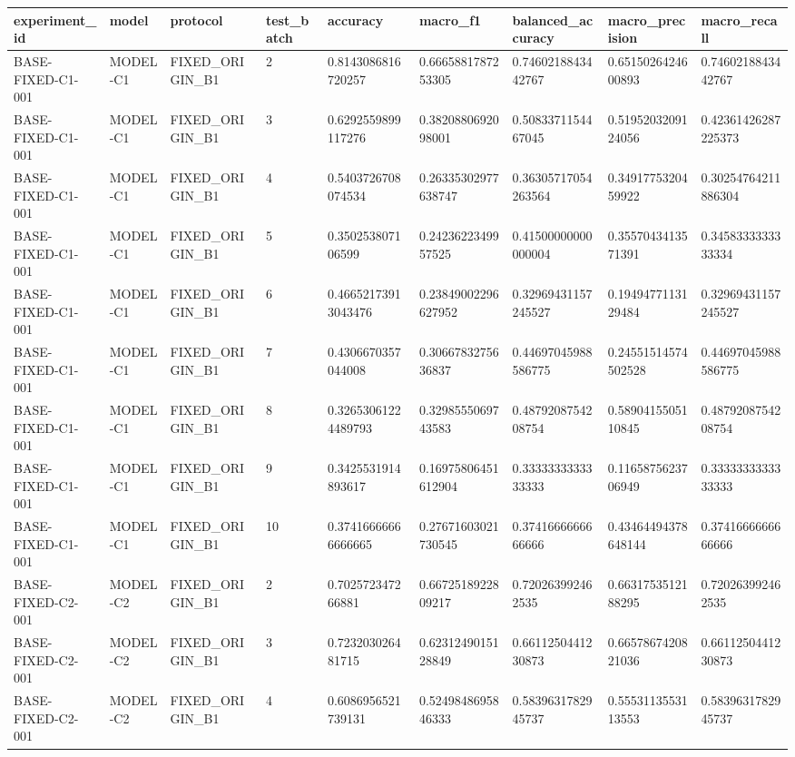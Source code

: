\begin{tabular}{lllllllll}
 \hline
experiment\_id & model & protocol & test\_batch & accuracy & macro\_f1 & balanced\_accuracy & macro\_precision & macro\_recall \\
 \hline
BASE-FIXED-C1-001 & MODEL-C1 & FIXED\_ORIGIN\_B1 & 2 & 0.8143086816720257 & 0.6665881787253305 & 0.7460218843442767 & 0.6515026424600893 & 0.7460218843442767 \\
BASE-FIXED-C1-001 & MODEL-C1 & FIXED\_ORIGIN\_B1 & 3 & 0.6292559899117276 & 0.3820880692098001 & 0.5083371154467045 & 0.5195203209124056 & 0.42361426287225373 \\
BASE-FIXED-C1-001 & MODEL-C1 & FIXED\_ORIGIN\_B1 & 4 & 0.5403726708074534 & 0.26335302977638747 & 0.36305717054263564 & 0.3491775320459922 & 0.30254764211886304 \\
BASE-FIXED-C1-001 & MODEL-C1 & FIXED\_ORIGIN\_B1 & 5 & 0.350253807106599 & 0.2423622349957525 & 0.41500000000000004 & 0.3557043413571391 & 0.3458333333333334 \\
BASE-FIXED-C1-001 & MODEL-C1 & FIXED\_ORIGIN\_B1 & 6 & 0.46652173913043476 & 0.23849002296627952 & 0.32969431157245527 & 0.1949477113129484 & 0.32969431157245527 \\
BASE-FIXED-C1-001 & MODEL-C1 & FIXED\_ORIGIN\_B1 & 7 & 0.4306670357044008 & 0.3066783275636837 & 0.44697045988586775 & 0.24551514574502528 & 0.44697045988586775 \\
BASE-FIXED-C1-001 & MODEL-C1 & FIXED\_ORIGIN\_B1 & 8 & 0.32653061224489793 & 0.3298555069743583 & 0.4879208754208754 & 0.5890415505110845 & 0.4879208754208754 \\
BASE-FIXED-C1-001 & MODEL-C1 & FIXED\_ORIGIN\_B1 & 9 & 0.3425531914893617 & 0.16975806451612904 & 0.3333333333333333 & 0.1165875623706949 & 0.3333333333333333 \\
BASE-FIXED-C1-001 & MODEL-C1 & FIXED\_ORIGIN\_B1 & 10 & 0.37416666666666665 & 0.27671603021730545 & 0.3741666666666666 & 0.43464494378648144 & 0.3741666666666666 \\
BASE-FIXED-C2-001 & MODEL-C2 & FIXED\_ORIGIN\_B1 & 2 & 0.702572347266881 & 0.6672518922809217 & 0.720263992462535 & 0.6631753512188295 & 0.720263992462535 \\
BASE-FIXED-C2-001 & MODEL-C2 & FIXED\_ORIGIN\_B1 & 3 & 0.723203026481715 & 0.6231249015128849 & 0.6611250441230873 & 0.6657867420821036 & 0.6611250441230873 \\
BASE-FIXED-C2-001 & MODEL-C2 & FIXED\_ORIGIN\_B1 & 4 & 0.6086956521739131 & 0.5249848695846333 & 0.5839631782945737 & 0.5553113553113553 & 0.5839631782945737 \\

\end{tabular}
